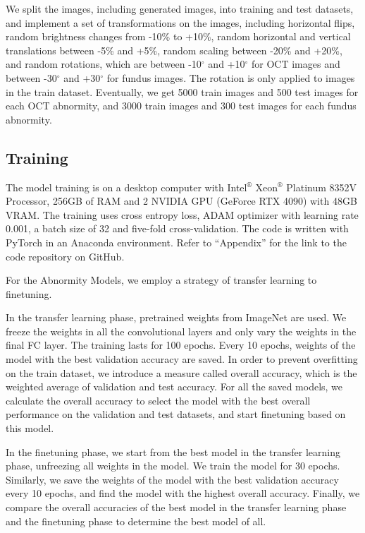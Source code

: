 \documentclass{article}
\begin{document}
	\begin{multicols}{2}
	We split the images, including generated images, into training and test datasets, and implement a set of transformations on the images, including horizontal flips, random brightness changes from -10\% to +10\%, random horizontal and vertical translations between -5\% and +5\%, random scaling between -20\% and +20\%, and random rotations, which are between -10$^\circ$ and +10$^\circ$ for OCT images and between -30$^\circ$ and +30$^\circ$ for fundus images. The rotation is only applied to images in the train dataset. Eventually, we get 5000 train images and 500 test images for each OCT abnormity, and 3000 train images and 300 test images for each fundus abnormity.
	
	\subsection{Training}
	\label{sec:a_training}
	
	The model training is on a desktop computer with Intel$^®$ Xeon$^®$ Platinum 8352V Processor, 256GB of RAM and 2 NVIDIA GPU (GeForce RTX 4090) with 48GB VRAM. The training uses cross entropy loss, ADAM optimizer with learning rate 0.001, a batch size of 32 and five-fold cross-validation. The code is written with PyTorch in an Anaconda environment. Refer to ``Appendix'' for the link to the code repository on GitHub. 
	
	\vspace{0.3cm}
	
	For the Abnormity Models, we employ a strategy of transfer learning to finetuning. 
	
	In the transfer learning phase, pretrained weights from ImageNet \autocite{Krizhevsky_Sutskever_Hinton_2017} are used. We freeze the weights in all the convolutional layers and only vary the weights in the final FC layer. The training lasts for 100 epochs. Every 10 epochs, weights of the model with the best validation accuracy are saved. In order to prevent overfitting on the train dataset, we introduce a measure called overall accuracy, which is the weighted average of validation and test accuracy. For all the saved models, we calculate the overall accuracy to select the model with the best overall performance on the validation and test datasets, and start finetuning based on this model. 
	
	In the finetuning phase, we start from the best model in the transfer learning phase, unfreezing all weights in the model. We train the model for 30 epochs. Similarly, we save the weights of the model with the best validation accuracy every 10 epochs, and find the model with the highest overall accuracy. Finally, we compare the overall accuracies of the best model in the transfer learning phase and the finetuning phase to determine the best model of all. 
	

\end{multicols}
\end{document}
